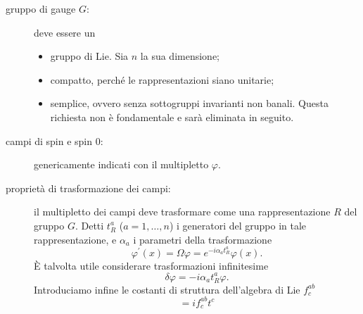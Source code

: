 \documentclass[italian,a4paper]{article}
\theoremstyle{definition}
\begin{document}
\begin{description}
    \item[gruppo di gauge $G$:] deve essere un
        \begin{itemize}
            \item gruppo di Lie. Sia $n$ la sua dimensione;
            \item compatto, perch\'e le rappresentazioni siano unitarie;
            \item semplice, ovvero senza sottogruppi invarianti non banali.
                Questa richiesta non \`e fondamentale e sar\`a eliminata in
                seguito.
        \end{itemize}
    \item[campi di spin  e spin $0$:] genericamente indicati
        con il multipletto $\varphi$.
    \item[propriet\`a di trasformazione dei campi: ] il multipletto dei
        campi deve trasformare come una rappresentazione $R$ del gruppo
        $G$. Detti $t^{a}_{R}$ ($a = 1, \dots, n$) i generatori del
        gruppo in tale rappresentazione, e $\alpha_a$  i parametri della
        trasformazione
        \begin{equation*}
            \varphi^\prime(x) = \Omega\varphi = e^{-i \alpha_a t^{a}_{R}}\varphi(x).
        \end{equation*}
        \`E talvolta utile considerare trasformazioni infinitesime
        \begin{equation*}
            \delta\varphi =   -i \alpha_a t^{a}_{R} \varphi.
        \end{equation*}
        Introduciamo infine le costanti di struttura dell'algebra di Lie
        $f^{ab}_{c}$
        \begin{equation*}
            [t^{a}, t^{b}] = if^{ab}_{c}t^{c}
        \end{equation*}
\end{description}
\end{document}
